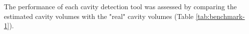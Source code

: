 \documentclass[Ingles]{phdthesis}
\begin{document}
The performance of each cavity detection tool was assessed by comparing the estimated cavity volumes with the "real" cavity volumes (Table \ref{tab:benchmark-1}). 
\end{document}
